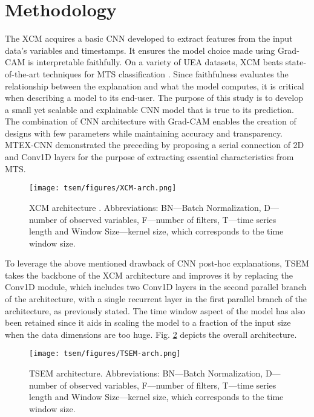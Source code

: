 \documentclass{svproc}
\begin{document}
\section{Methodology}
The XCM acquires a basic CNN developed to extract features from the input data's variables and timestamps. It ensures the model choice made using Grad-CAM \cite{selvaraju2017grad} is interpretable faithfully. On a variety of UEA datasets, XCM beats state-of-the-art techniques for MTS classification \cite{bagnall2018uea}. Since faithfulness evaluates the relationship between the explanation and what the model computes, it is critical when describing a model to its end-user. The purpose of this study is to develop a small yet scalable and explainable CNN model that is true to its prediction.
The combination of CNN architecture with Grad-CAM enables the creation of designs with few parameters while maintaining accuracy and transparency. MTEX-CNN demonstrated the preceding by proposing a serial connection of 2D and Conv1D layers for the purpose of extracting essential characteristics from MTS.  
\begin{figure}[h]
\centering
\texttt{[image: tsem/figures/XCM-arch.png]}
\caption{XCM architecture \protect\cite{fauvel2021xcm}. Abbreviations: BN—Batch Normalization, D—number of observed variables,
F—number of filters, T—time series length and Window Size—kernel size, which corresponds
to the time window size.}
\label{fig:XCM_arch}
\end{figure}

To leverage the above mentioned drawback of CNN post-hoc explanations, TSEM takes the backbone of the XCM architecture and improves it by replacing the Conv1D module, which includes two Conv1D layers in the second parallel branch of the architecture, with a single recurrent layer in the first parallel branch of the architecture, as previously stated. The time window aspect of the model has also been retained since it aids in scaling the model to a fraction of the input size when the data dimensions are too huge. Fig. \ref{fig:TSEM_arch} depicts the overall architecture. 

\begin{figure}[h!]
\centering
\texttt{[image: tsem/figures/TSEM-arch.png]}
\caption{TSEM architecture. Abbreviations: BN—Batch Normalization, D—number of observed variables,
F—number of filters, T—time series length and Window Size—kernel size, which corresponds
to the time window size.}
\label{fig:TSEM_arch}
\end{figure}
\end{document}
